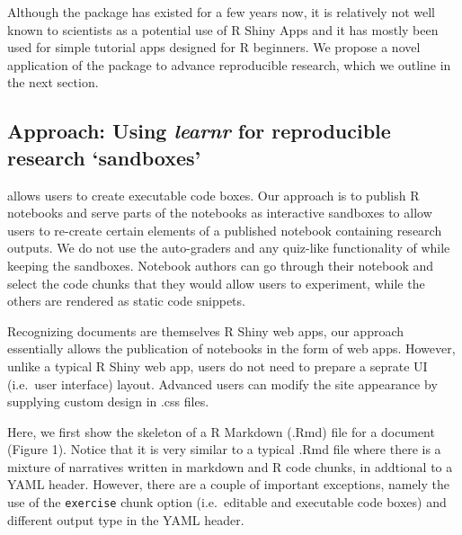 Although the  package has existed for a few years now,
it is relatively not well known to scientists as a potential use of R
Shiny Apps and it has mostly been used for simple tutorial apps designed
for R beginners. We propose a novel application of the 
package to advance reproducible research, which we outline in the next
section.

\hypertarget{approach-using-learnr-for-reproducible-research-sandboxes}{%
\subsection{\texorpdfstring{Approach: Using \emph{learnr} for
reproducible research
`sandboxes'}{Approach: Using learnr for reproducible research `sandboxes'}}\label{approach-using-learnr-for-reproducible-research-sandboxes}}

 allows users to create executable code boxes. Our
approach is to publish R notebooks and serve parts of the notebooks as
interactive sandboxes to allow users to re-create certain elements of a
published notebook containing research outputs. We do not use the
auto-graders and any quiz-like functionality of  while
keeping the sandboxes. Notebook authors can go through their notebook
and select the code chunks that they would allow users to experiment,
while the others are rendered as static code snippets.

Recognizing  documents are themselves R Shiny web apps,
our approach essentially allows the publication of notebooks in the form
of web apps. However, unlike a typical R Shiny web app, users do not
need to prepare a seprate UI (i.e.~user interface) layout. Advanced
users can modify the site appearance by supplying custom design in .css
files.

Here, we first show the skeleton of a R Markdown (.Rmd) file for a
 document (Figure 1). Notice that it is very similar to
a typical .Rmd file where there is a mixture of narratives written in
markdown and R code chunks, in addtional to a YAML header. However,
there are a couple of important exceptions, namely the use of the
\texttt{exercise} chunk option (i.e.~editable and executable code boxes)
and different output type in the YAML header.

